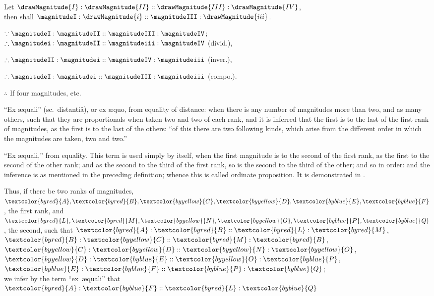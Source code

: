\documentclass[booklanguage=english]{byrnebook}
\begin{document}
\begin{center}
Let $\drawMagnitude{I} : \drawMagnitude{II} :: \drawMagnitude{III} : \drawMagnitude{IV}$,\\
then shall $\magnitudeI : \drawMagnitude{i} :: \magnitudeIII : \drawMagnitude{iii}$.

$\because \magnitudeI : \magnitudeII :: \magnitudeIII : \magnitudeIV$;\\ %
$\therefore \magnitudei : \magnitudeII :: \magnitudeiii : \magnitudeIV$ (divid.), %

$\therefore \magnitudeII : \magnitudei :: \magnitudeIV : \magnitudeiii$ (inver.),

$\therefore \magnitudeI : \magnitudei :: \magnitudeIII : \magnitudeiii$ (compo.).

$\therefore$ If four magnitudes, etc.
\end{center}

\label{def:V.XVIII} 
\enquote{Ex \ae quali} (sc.\ distantiâ), or ex \ae quo, from equality of distance: when there is any number of magnitudes more than two, and as many others, such that they are proportionals when taken two and two of each rank, and it is inferred that the first is to the last of the first rank of magnitudes, as the first is to the last of the others: \enquote{of this there are two following kinds, which arise from the different order in which the magnitudes are taken, two and two.}

\vfill\pagebreak

\label{def:V.XIX} 
\def\varA{\textcolor{byred}{A}}
\def\varB{\textcolor{byred}{B}}
\def\varC{\textcolor{byyellow}{C}}
\def\varD{\textcolor{byyellow}{D}}
\def\varE{\textcolor{byblue}{E}}
\def\varF{\textcolor{byblue}{F}}
\def\varL{\textcolor{byred}{L}}
\def\varM{\textcolor{byred}{M}}
\def\varN{\textcolor{byyellow}{N}}
\def\varO{\textcolor{byyellow}{O}}
\def\varP{\textcolor{byblue}{P}}
\def\varQ{\textcolor{byblue}{Q}}
\enquote{Ex \ae quali,} from equality. This term is used simply by itself, when the first magnitude is to the second of the first rank, as the first to the second of the other rank; and as the second to the third of the first rank, so is the second to the third of the other; and so in order: and the inference is as mentioned in the preceding definition; whence this is called ordinate proposition. It is demonstrated in .

\begin{center}
Thus, if there be two ranks of magnitudes,\\
$\varA, \varB, \varC, \varD, \varE, \varF$, the first rank,
and $\varL, \varM, \varN, \varO, \varP, \varQ$, the second,
such that $\varA : \varB :: \varL : \varM$, $\varB : \varC :: \varM : \varB$, $\varC : \varD :: \varN : \varO$, $\varD : \varE :: \varO : \varP$, $\varE : \varF :: \varP : \varQ$;\\
we infer by the term \enquote{ex~\ae quali} that $\varA : \varF :: \varL : \varQ$
\end{center}
\end{document}
